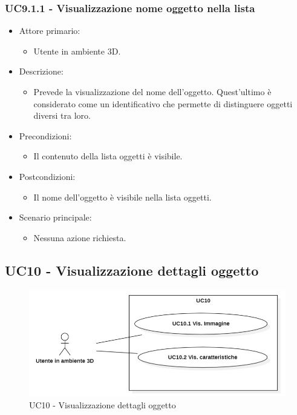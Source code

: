 \subsubsection{UC9.1.1 - Visualizzazione nome oggetto nella lista}
\begin{itemize}

	\item Attore primario: 
	\begin{itemize}
		\item Utente in ambiente 3D.
	\end{itemize}
	\item Descrizione:
	\begin{itemize}
		\item Prevede la visualizzazione del nome dell’oggetto. Quest'ultimo è considerato come un identificativo che permette di distinguere oggetti diversi tra loro.
	\end{itemize}
	
	\item Precondizioni:
	\begin{itemize}
		\item Il contenuto della lista oggetti è visibile.
	\end{itemize}
	
	\item Postcondizioni:
	\begin{itemize}
		\item Il nome dell'oggetto è visibile nella lista oggetti.
	\end{itemize}
	
	\item Scenario principale:
	\begin{itemize}
		\item Nessuna azione richiesta.
	\end{itemize}
	
\end{itemize}

\pagebreak

\subsection{UC10 - Visualizzazione dettagli oggetto}

\begin{figure}[H]
  \renewcommand{\thefigure}{13}
  \includegraphics[width=\linewidth]{./res/images/UC10.png}
  \caption{UC10 - Visualizzazione dettagli oggetto}
  \label{fig:UC 10}
\end{figure}

